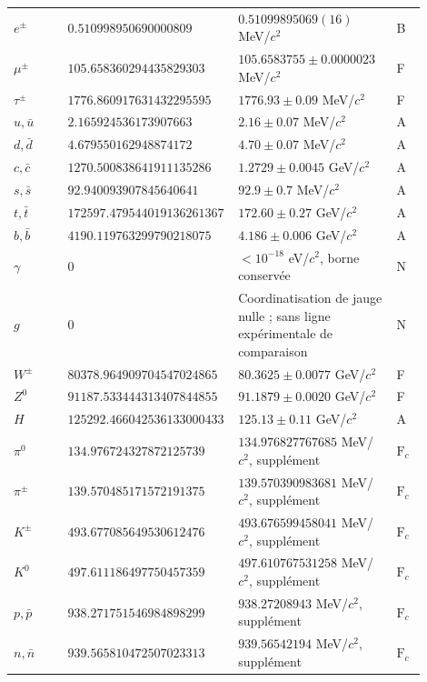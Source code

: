 \begin{table}[!htbp]
\begin{tabular}{p{0.13\linewidth}p{0.32\linewidth}p{0.38\linewidth}p{0.07\linewidth}}
\(e^\pm\) & \(0.510998950\allowbreak690000809\) & \(0.51099895069(16)\) MeV/\(c^2\) & B\\
\(\mu^\pm\) & \(105.658360294\allowbreak435829303\) & \(105.6583755\pm0.0000023\) MeV/\(c^2\) & F\\
\(\tau^\pm\) & \(1776.860917631\allowbreak432295595\) & \(1776.93\pm0.09\) MeV/\(c^2\) & F\\
\(u,\bar u\) & \(2.165924536\allowbreak173907663\) & \(2.16\pm0.07\) MeV/\(c^2\) & A\\
\(d,\bar d\) & \(4.679550162\allowbreak948874172\) & \(4.70\pm0.07\) MeV/\(c^2\) & A\\
\(c,\bar c\) & \(1270.500838641\allowbreak911135286\) & \(1.2729\pm0.0045\) GeV/\(c^2\) & A\\
\(s,\bar s\) & \(92.940093907\allowbreak845640641\) & \(92.9\pm0.7\) MeV/\(c^2\) & A\\
\(t,\bar t\) & \(172597.479544019\allowbreak136261367\) & \(172.60\pm0.27\) GeV/\(c^2\) & A\\
\(b,\bar b\) & \(4190.119763299\allowbreak790218075\) & \(4.186\pm0.006\) GeV/\(c^2\) & A\\
\(\gamma\) & \(0\) & \(<10^{-18}\) eV/\(c^2\), borne conservée
 & N\\
\(g\) & \(0\) & Coordinatisation de jauge nulle ; sans ligne expérimentale de comparaison
 & N\\
\(W^\pm\) & \(80378.964909704\allowbreak547024865\) & \(80.3625\pm0.0077\) GeV/\(c^2\) & F\\
\(Z^0\) & \(91187.533444313\allowbreak407844855\) & \(91.1879\pm0.0020\) GeV/\(c^2\) & F\\
\(H\) & \(125292.466042536\allowbreak133000433\) & \(125.13\pm0.11\) GeV/\(c^2\) & A\\
\(\pi^0\) & \(134.976724327\allowbreak872125739\) & \(134.976827767685\) MeV/\(c^2\), supplément
 & \(\mathrm F_c\)\\
\(\pi^\pm\) & \(139.570485171\allowbreak572191375\) & \(139.570390983681\) MeV/\(c^2\), supplément
 & \(\mathrm F_c\)\\
\(K^\pm\) & \(493.677085649\allowbreak530612476\) & \(493.676599458041\) MeV/\(c^2\), supplément
 & \(\mathrm F_c\)\\
\(K^0\) & \(497.611186497\allowbreak750457359\) & \(497.610767531258\) MeV/\(c^2\), supplément
 & \(\mathrm F_c\)\\
\(p,\bar p\) & \(938.271751546\allowbreak984898299\) & \(938.27208943\) MeV/\(c^2\), supplément
 & \(\mathrm F_c\)\\
\(n,\bar n\) & \(939.565810472\allowbreak507023313\) & \(939.56542194\) MeV/\(c^2\), supplément
 & \(\mathrm F_c\)\\
\end{tabular}
\end{table}
\endgroup

